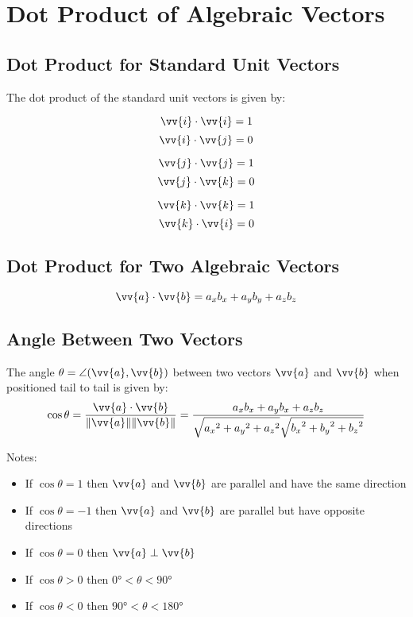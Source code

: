 	\section{Dot Product of Algebraic Vectors}
		\subsection{Dot Product for Standard Unit Vectors}
			The dot product of the standard unit vectors is given by:
			\begin{center}
				\begin{minipage}{0.3\textwidth}
					\[\vv{i} \cdot \vv{i} = 1\]
					\[\vv{i} \cdot \vv{j} = 0\]
				\end{minipage}
				\begin{minipage}{0.3\textwidth}
					\[\vv{j} \cdot \vv{j} = 1\]
					\[\vv{j} \cdot \vv{k} = 0\]
				\end{minipage}
				\begin{minipage}{0.3\textwidth}
					\[\vv{k} \cdot \vv{k} = 1\]
					\[\vv{k} \cdot \vv{i} = 0\]
				\end{minipage}
			\end{center}
		\subsection{Dot Product for Two Algebraic Vectors}
			\[\vv{a} \cdot \vv{b} = a_xb_x + a_yb_y + a_zb_z\]
		\subsection{Angle Between Two Vectors}
			The angle $\theta = \angle(\vv{a}, \vv{b})$ between two vectors $\vv{a}$ and $\vv{b}$ when positioned tail to tail is given by:
			\[\cos\theta = \frac{\vv{a} \cdot \vv{b}}{\|\vv{a}\|\|\vv{b}\|} = \frac{a_xb_x + a_yb_x + a_zb_z}{\sqrt{{a_x}^2 + {a_y}^2 + {a_z}^2 \vphantom{{b_x}^2}}\sqrt{{b_x}^2 + {b_y}^2 + {b_z}^2}}\]

			Notes:
			\begin{itemize}
				\item If $\cos\theta = 1$ then $\vv{a}$ and $\vv{b}$ are parallel and have the same direction
				\item If $\cos\theta = -1$ then $\vv{a}$ and $\vv{b}$ are parallel but have opposite directions
				\item If $\cos\theta = 0$ then $\vv{a} \perp \vv{b}$
				\item If $\cos\theta > 0$ then $\ang{0} < \theta < \ang{90}$
				\item If $\cos\theta < 0$ then $\ang{90} < \theta < \ang{180}$
			\end{itemize}
